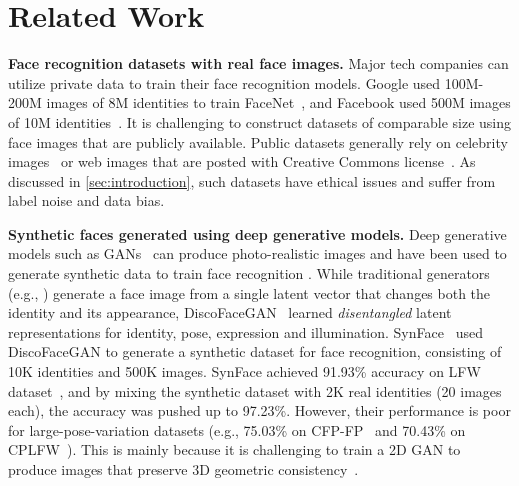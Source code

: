 \documentclass[10pt,twocolumn,letterpaper]{article}
\begin{document}
\section{Related Work}

\noindent
\textbf{Face recognition datasets with real face images.} Major tech companies can utilize private data to train their face recognition models. Google used 100M-200M images of 8M identities to train FaceNet~\cite{2015_FR_facenet}, and Facebook used 500M images of 10M identities~\cite{2015_FR_facebook}. It is challenging to construct datasets of comparable size using face images that are publicly available. Public datasets generally rely on celebrity images~\cite{2008_FRD_LFW,2014_FRD_casiawebface,2016_FRD_ms1m,2021_FRD_webface260m} or web images that are posted with Creative Commons license~\cite{2016_FRD_megafacev1,2017_FRD_megafacev2}. As discussed in \autoref{sec:introduction}, such datasets have ethical issues and suffer from label noise and data bias.

\noindent
\textbf{Synthetic faces generated using deep generative models.}
Deep generative models such as GANs~\cite{2014_gan} can produce photo-realistic images and have been used to generate synthetic data to train face recognition \cite{2021_Trigueros, 2021_FR_synface}. While traditional generators (e.g., \cite{2017_progressive_gan}) generate a face image from a single latent vector that changes both the identity and its appearance, DiscoFaceGAN~\cite{2020_discofacegan} learned \textit{disentangled} latent representations for identity, pose, expression and illumination. SynFace~\cite{2021_FR_synface} used DiscoFaceGAN to generate a synthetic dataset for face recognition, consisting of 10K identities and 500K images. SynFace achieved 91.93\% accuracy on LFW dataset~\cite{2008_FRD_LFW}, and by mixing the synthetic dataset with 2K real identities (20 images each), the accuracy was pushed up to 97.23\%. However, their performance is poor for large-pose-variation datasets (e.g., 75.03\% on CFP-FP~\cite{2016_FRD_CFPFP} and 70.43\% on CPLFW~\cite{2018_FRD_CPLFW}). This is mainly because it is challenging to train a 2D GAN to produce images that preserve 3D geometric consistency~\cite{2022_gram}.
\end{document}
